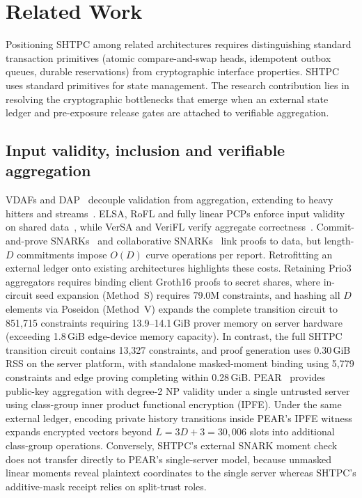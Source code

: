\documentclass[conference,compsoc]{IEEEtran}
\theoremstyle{definition}
\numberwithin{equation}{section}
\numberwithin{table}{section}
\numberwithin{figure}{section}
\theoremstyle{plain}
\begin{document}
\section{Related Work}
\label{sec:related-work-summary}

Positioning SHTPC among related architectures requires distinguishing standard transaction primitives (atomic compare-and-swap heads, idempotent outbox queues, durable reservations) from cryptographic interface properties. SHTPC uses standard primitives for state management. The research contribution lies in resolving the cryptographic bottlenecks that emerge when an external state ledger and pre-exposure release gates are attached to verifiable aggregation.

\subsection{Input validity, inclusion and verifiable aggregation}
VDAFs and DAP~\cite{Addanki2022PrioPlus,Barnes2023VDAF08,Geoghegan2026DAP,Davis2023VDAFPrivacy} decouple validation from aggregation, extending to heavy hitters and streams~\cite{Boneh2021Poplar,Mouris2025Mastic,Rathee2024Whisper}. ELSA, RoFL and fully linear PCPs enforce input validity on shared data~\cite{Rathee2023ELSA,Lycklama2023RoFL,Boneh2019FullyLinear}, while VerSA and VeriFL verify aggregate correctness~\cite{Hahn2023VerSA,Luo2024VerSAComments,Guo2021VeriFL,Guo2022VeriFLFix}. Commit-and-prove SNARKs~\cite{Campanelli2019LegoSNARK} and collaborative SNARKs~\cite{Ozdemir2022Collaborative} link proofs to data, but length-\(D\) commitments impose \(O(D)\) curve operations per report.
Retrofitting an external ledger onto existing architectures highlights these costs. Retaining Prio3 aggregators requires binding client Groth16 proofs to secret shares, where in-circuit seed expansion (Method~S) requires 79.0M constraints, and hashing all \(D\) elements via Poseidon (Method~V) expands the complete transition circuit to 851,715 constraints requiring 13.9--14.1\,GiB prover memory on server hardware (exceeding 1.8\,GiB edge-device memory capacity). In contrast, the full SHTPC transition circuit contains 13,327 constraints, and proof generation uses 0.30\,GiB RSS on the server platform, with standalone masked-moment binding using 5,779 constraints and edge proving completing within 0.28\,GiB.
PEAR~\cite{Acharya2025PEAR} provides public-key aggregation with degree-2 NP validity under a single untrusted server using class-group inner product functional encryption (IPFE). Under the same external ledger, encoding private history transitions inside PEAR's IPFE witness expands encrypted vectors beyond \(L=3D+3=30{,}006\) slots into additional class-group operations. Conversely, SHTPC's external SNARK moment check does not transfer directly to PEAR's single-server model, because unmasked linear moments reveal plaintext coordinates to the single server whereas SHTPC's additive-mask receipt relies on split-trust roles.
\end{document}

